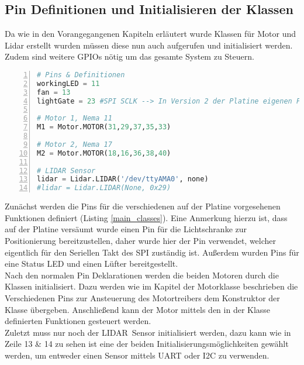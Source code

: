 \subsection{Pin Definitionen und Initialisieren der Klassen}
Da wie in den Vorangegangenen Kapiteln erläutert wurde Klassen für Motor und Lidar erstellt wurden müssen diese nun auch aufgerufen und initialisiert werden. Zudem sind weitere \acp{GPIO} nötig um das gesamte System zu Steuern.
\begin{lstlisting}[caption={Initialisieren von Variablen und Klassen}, language={Python}, label={main_classes}, numbers=left]
# Pins & Definitionen
workingLED = 11
fan = 13
lightGate = 23 #SPI SCLK --> In Version 2 der Platine eigenen Pin zuweisen

# Motor 1, Nema 11
M1 = Motor.MOTOR(31,29,37,35,33)

# Motor 2, Nema 17
M2 = Motor.MOTOR(18,16,36,38,40)

# LIDAR Sensor
lidar = Lidar.LIDAR('/dev/ttyAMA0', none)
#lidar = Lidar.LIDAR(None, 0x29)
\end{lstlisting}
Zunächst werden die Pins für die verschiedenen auf der Platine vorgesehenen Funktionen definiert (Listing \ref{main_classes}). Eine Anmerkung hierzu ist, dass auf der Platine versäumt wurde einen Pin für die Lichtschranke zur Positionierung bereitzustellen, daher wurde hier der Pin verwendet, welcher eigentlich für den Seriellen Takt des \ac{SPI} zuständig ist. Außerdem wurden Pins für eine Status LED und einen Lüfter bereitgestellt. \\
Nach den normalen Pin Deklarationen werden die beiden Motoren durch die Klassen initialisiert. Dazu werden wie im Kapitel der Motorklasse beschrieben die Verschiedenen Pins zur Ansteuerung des Motortreibers dem Konstruktor der Klasse übergeben. Anschließend kann der Motor mittels den in der Klasse definierten Funktionen gesteuert werden.\\
Zuletzt muss nur noch der \ac{LIDAR} Sensor initialisiert werden, dazu kann wie in Zeile 13 \& 14 zu sehen ist eine der beiden Initialisierungsmöglichkeiten gewählt werden, um entweder einen Sensor mittels \ac{UART} oder \ac{I2C} zu verwenden.\\
